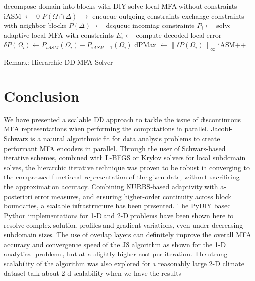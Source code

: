 \documentclass[conference]{IEEEtran}
\newcommand{\Remark}[1]{{\color{RED}\sf Remark: {#1}}}
\begin{document}
\begin{algorithm}
    \DontPrintSemicolon
    decompose domain into blocks with DIY\;
    solve local MFA without constraints\;
    \;
    iASM $\leftarrow$ 0\;
    {
        $P(\Omega \cap \Delta)$ $\rightarrow$ enqueue outgoing constraints\;
        exchange constraints with neighbor blocks\;
        $P(\Delta)$ $\leftarrow$ dequeue incoming constraints\;
        \;
        {
            $P_i \leftarrow$ solve adaptive local MFA with constraints\;
            $E_i \leftarrow$ compute decoded local error\;
            $\delta P (\Omega_i) \leftarrow P_{iASM} (\Omega_i) - P_{iASM-1} (\Omega_i)$\;
        }
        dPMax $\leftarrow \left\lVert \delta P (\Omega_i) \right\rVert_{\infty}$\;
    	iASM++\;
    }
    \caption{\Remark{Hierarchic DD MFA Solver}}
    \label{alg:pseudocode}
\end{algorithm}




\section{Conclusion}

We have presented a scalable DD approach to tackle the issue of discontinuous MFA representations when performing the computations in parallel. Jacobi-Schwarz is a natural algorithmic fit for data analysis problems to create performant MFA encoders in parallel. Through the user of Schwarz-based iterative schemes, combined with L-BFGS or Krylov solvers for local subdomain solves, the hierarchic iterative technique was proven to be robust in converging to the compressed functional representation of the given data, without sacrificing the approximation accuracy. Combining NURBS-based adaptivity with a-posteriori error measures, and ensuring higher-order continuity across block boundaries, a scalable infrastructure has been presented. The PyDIY based Python implementations for 1-D and 2-D problems have been shown here to resolve complex solution profiles and gradient variations, even under decreasing subdomain sizes. The use of overlap layers can definitely improve the overall MFA accuracy and convergence speed of the JS algorithm as shown for the 1-D analytical problems, but at a slightly higher cost per iteration. The strong scalability of the algorithm was also explored for a reasonably large 2-D climate dataset {\color{red} talk about 2-d scalability when we have the results}
\end{document}
